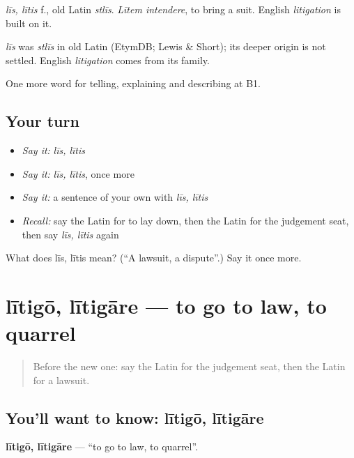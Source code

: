 \emph{līs, lītis} f., old Latin \emph{stlīs}. \emph{Lītem intendere}, to bring a suit. English \emph{litigation} is built on it.

\begin{cousinweb}
\emph{līs} was \emph{stlīs} in old Latin (EtymDB; Lewis \& Short); its deeper origin is not settled. English \emph{litigation} comes from its family.
\end{cousinweb}

\begin{grammarlens}[title={What you've built}]
One more word for telling, explaining and describing at B1.
\end{grammarlens}

\subsection*{Your turn}
\begin{itemize}
\raggedright
  \item \emph{Say it:} \emph{līs, lītis}
  \item \emph{Say it:} \emph{līs, lītis}, once more
  \item \emph{Say it:} a sentence of your own with \emph{līs, lītis}
  \item \emph{Recall:} say the Latin for to lay down, then the Latin for the judgement seat, then say \emph{līs, lītis} again
\end{itemize}

\begin{tcolorbox}[breakable,colback=teal!4,colframe=teal!35!black,title={Before you move on}]
What does līs, lītis mean? (\textquotedblleft{}A lawsuit, a dispute\textquotedblright{}.) Say it once more.
\end{tcolorbox}
\section[lītigō, lītigāre]{lītigō, lītigāre — to go to law, to quarrel}

\label{lesson:LA-C411-litigo}



\begin{quote}
Before the new one: say the Latin for the judgement seat, then the Latin for a lawsuit.
\end{quote}

\subsection*{You'll want to know: lītigō, lītigāre}
\textbf{lītigō, lītigāre} — \textquotedblleft{}to go to law, to quarrel\textquotedblright{}.

